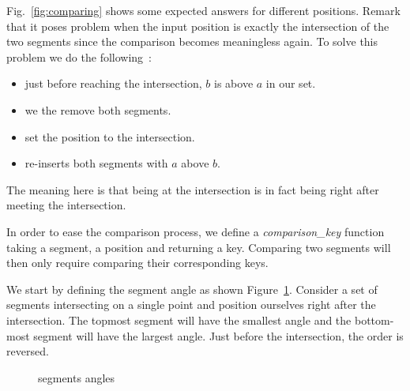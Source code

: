 \documentclass[a4paper, 11pt]{article}
\begin{document}
Fig.~\ref{fig:comparing} shows some expected answers for different positions.
Remark that it poses problem when the input position is exactly the intersection
of the two segments since the comparison becomes meaningless again.
To solve this problem we do the following~:
\begin{itemize}
  \item just before reaching the intersection, $b$ is above $a$ in our set.
  \item we the remove both segments.
  \item set the position to the intersection.
  \item re-inserts both segments with $a$ above $b$.
\end{itemize}

The meaning here is that being at the intersection is in fact being
right after meeting the intersection.

In order to ease the comparison process, we define a \emph{comparison\_key} function
taking a segment, a position and returning a key. Comparing two segments will then
only require comparing their corresponding keys.

We start by defining the segment angle as shown Figure~\ref{fig:angles}.
Consider a set of segments intersecting on a single point and position ourselves right
after the intersection. The topmost segment will have the smallest angle and the bottom-most
segment will have the largest angle.
Just before the intersection, the order is reversed.

\begin{figure}[htbp]
    \begin{center}
        \caption{segments angles}
        \label{fig:angles}
    \end{center}
\end{figure}
\end{document}
